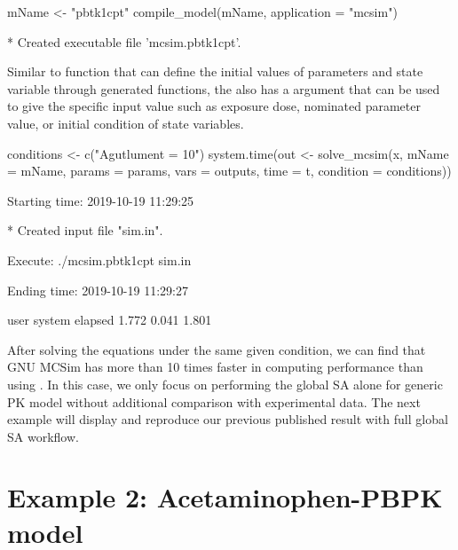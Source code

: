 \begin{Schunk}
\begin{Sinput}
mName <- "pbtk1cpt"
compile_model(mName, application = "mcsim")
\end{Sinput}
\begin{Soutput}
  * Created executable file 'mcsim.pbtk1cpt'.
\end{Soutput}
\end{Schunk}

Similar to  function that can define the initial values
of parameters and state variable through generated functions, the
 also has a  argument that can be
used to give the specific input value such as exposure dose, nominated
parameter value, or initial condition of state variables.

\begin{Schunk}
\begin{Sinput}
conditions <- c("Agutlument = 10") 
system.time(out <- solve_mcsim(x, mName = mName, params = params, 
                               vars = outputs, time = t, 
                               condition = conditions))
\end{Sinput}
\begin{Soutput}
  Starting time: 2019-10-19 11:29:25
\end{Soutput}
\begin{Soutput}
  * Created input file "sim.in".
\end{Soutput}
\begin{Soutput}
  Execute: ./mcsim.pbtk1cpt sim.in
\end{Soutput}
\begin{Soutput}
  Ending time: 2019-10-19 11:29:27
\end{Soutput}
\begin{Soutput}
     user  system elapsed 
    1.772   0.041   1.801
\end{Soutput}
\end{Schunk}

After solving the equations under the same given condition, we can find
that GNU MCSim has more than 10 times faster in computing performance
than using . In this case, we only focus on performing
the global SA alone for generic PK model without additional comparison
with experimental data. The next example will display and reproduce our
previous published result \citep{fphar201800588} with full global SA
workflow.

\hypertarget{example-2-acetaminophen-pbpk-model}{%
\section{Example 2: Acetaminophen-PBPK
model}\label{example-2-acetaminophen-pbpk-model}}

